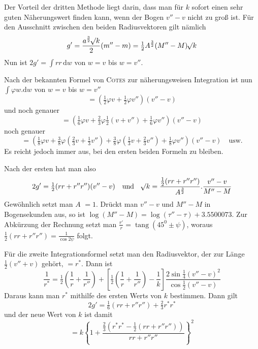 Der Vorteil der dritten Methode liegt darin, dass man für $k$ sofort einen sehr guten Näherungswert finden kann, wenn der Bogen $v''-v$ nicht zu groß ist. Für den Ausschnitt zwischen den beiden Radiusvektoren gilt nämlich
\[
g'=\frac{a^{\frac32}\mathord{{}^{}\!\surd}k}2(m''-m)=\tfrac12A^{\frac32}(M''-M)\mathord{{}^{}\!\surd}k
\]
Nun ist $2g'=\int rr\,\mathrm{d}w$ von $w=v$ bis $w=v''$.

Nach der bekannten Formel von \textsc{Cotes} zur näherungsweisen Integration ist nun $\int\varphi w.\mathrm{d}w$ von $w=v$ bis $w=v''$
\[
=(\tfrac12\varphi v+\tfrac12\varphi v'')(v''-v)
\]
%
und noch genauer
\[
=(\tfrac16\varphi v+\tfrac23\varphi\tfrac12(v+v'')+\tfrac16\varphi v'')(v''-v)
\]
noch genauer
\[
=(\tfrac18\varphi v+\tfrac38\varphi(\tfrac23v+\tfrac13v'')+\tfrac38\varphi(\tfrac13v+\tfrac23v'')+\tfrac18\varphi v'')(v''-v)\quad\text{usw.}
\]
Es reicht jedoch immer aus, bei den ersten beiden Formeln zu bleiben.

Nach der ersten hat man also
\[
2g'=\tfrac12(rr+r''r'')(v''-v)\quad\text{und}\quad\mathord{{}^{}\!\surd}k=\frac{\tfrac12(rr+r''r'')}{A^{\frac32}}.\frac{v''-v}{M''-M}
\]
Gewöhnlich setzt man $A$ $=1$. Drückt man $v''-v$ und $M''-M$ in Bogensekunden aus, so ist $\log(M''-M)=\log(\tau''-\tau)+3.5500073$. Zur Abkürzung der Rechnung setzt man $\frac{r'}r=\operatorname{tang}(45^0\pm\psi)$, woraus $\tfrac12(rr+r''r'')=\frac1{\cos2\psi}$ folgt.

Für die zweite Integrationsformel setzt man den Radiusvektor, der zur Länge $\tfrac12(v''+v)$ gehört, $=r^*$. Dann ist
\[
\frac1{r^*}=\tfrac12\left(\frac1r+\frac1{r''}\right)+\left[\tfrac12\left(\frac1r+\frac1{r''}\right)-\frac1k\right]\frac{2\sin\tfrac14(v''-v)^2}{\cos\tfrac12(v''-v)}
\]
Daraus kann man $r^*$ mithilfe des ersten Werts von $k$ bestimmen. Dann gilt
\[
2g'=\tfrac16(rr+r''r'')+\tfrac23r^*r^*
\]
und der neue Wert von $k$ ist damit
\[
=k\left\{1+\frac{\tfrac23(r^*r^*-\tfrac12(rr+r''r''))}{rr+r''r''}\right\}^2
\]

